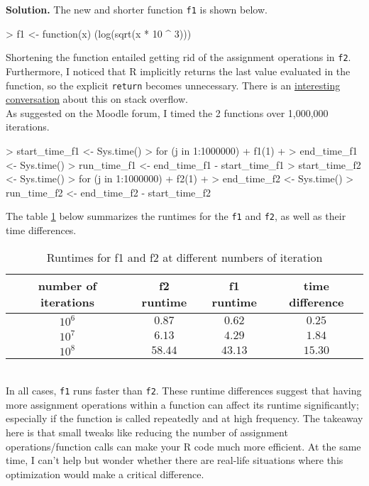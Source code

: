 \documentclass{article}
\begin{document}
\begin{enumerate}
\textbf{Solution.} The new and shorter function \texttt{f1} is shown below.
\begin{Schunk}
\begin{Sinput}
> f1 <- function(x) (log(sqrt(x * 10 ^ 3)))
\end{Sinput}
\end{Schunk}
Shortening the function entailed getting rid of the assignment operations in \texttt{f2}. Furthermore, I noticed that R implicitly returns the last value evaluated in the function, so the explicit \texttt{return} becomes unnecessary. There is an \href{https://stackoverflow.com/questions/11738823/explicitly-calling-return-in-a-function-or-not}{interesting conversation} about this on stack overflow.\\

As suggested on the Moodle forum, I timed the 2 functions over 1,000,000 iterations. 

\begin{Schunk}
\begin{Sinput}
> start_time_f1 <- Sys.time()
> for (j in 1:1000000) {
+   f1(1)
+ }
> end_time_f1 <- Sys.time()
> run_time_f1 <- end_time_f1 - start_time_f1
> start_time_f2 <- Sys.time()
> for (j in 1:1000000) {
+   f2(1)
+ }
> end_time_f2 <- Sys.time()
> run_time_f2 <- end_time_f2 - start_time_f2
\end{Sinput}
\end{Schunk}
The table \ref{table:q1} below summarizes the runtimes for the \texttt{f1} and \texttt{f2}, as well as
their time differences. 
\begin{table}[!h]
\centering
  \begin{tabular}{cccc}\hline
    number of iterations & f2 runtime & f1 runtime & time difference\\\hline\hline
    $10^6$ & $0.87$ & $0.62$ & $0.25$\\
    $10^7$ & $6.13$ & $4.29$ & $1.84$\\
    $10^8$ & $58.44$ & $43.13$ & $15.30$\\\hline
  \end{tabular}
  \caption{Runtimes for f1 and f2 at different numbers of iteration}
  \label{table:q1}
\end{table}\\
In all cases, \texttt{f1} runs faster than \texttt{f2}. 
These runtime differences suggest that having more assignment operations within a function can affect its runtime significantly; especially if the function is called repeatedly and at high frequency. The takeaway here is that small tweaks like reducing the number of assignment operations/function calls can make your R code much more efficient. At the same time, I can't help but wonder whether there are real-life situations where this optimization would make a critical difference.


\end{enumerate}
\end{document}
